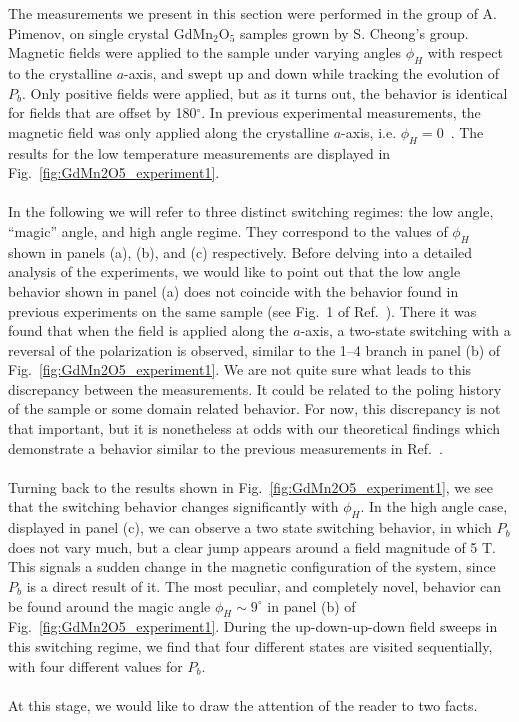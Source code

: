 The measurements we present in this section were performed in the group of A. Pimenov, on single crystal GdMn$_2$O$_5$ samples grown by S. Cheong's group.
Magnetic fields were applied to the sample under varying angles $\phi_H$ with respect to the crystalline $a$-axis, and swept up and down while tracking the evolution of $P_b$.
Only positive fields were applied, but as it turns out, the behavior is identical for fields that are offset by 180$^\circ$. 
In previous experimental measurements, the magnetic field was only applied along the crystalline $a$-axis, i.e. $\phi_H = 0$~\cite{Lee13}.
The results for the low temperature measurements are displayed in Fig.~\ref{fig:GdMn2O5_experiment1}.
\\\\
In the following we will refer to three distinct switching regimes: the low angle, ``magic'' angle, and high angle regime.
They correspond to the values of $\phi_H$ shown in panels (a), (b), and (c) respectively.
Before delving into a detailed analysis of the experiments, we would like to point out that the low angle behavior shown in panel (a) does not coincide with the behavior found in previous experiments on the same sample (see Fig.~1 of Ref.~\cite{Lee13}).
There it was found that when the field is applied along the $a$-axis, a two-state switching with a reversal of the polarization is observed, similar to the 1--4 branch in panel (b) of Fig.~\ref{fig:GdMn2O5_experiment1}.
We are not quite sure what leads to this discrepancy between the measurements. It could be related to the poling history of the sample or some domain related behavior.
For now, this discrepancy is not that important, but it is nonetheless at odds with our theoretical findings which demonstrate a behavior similar to the previous measurements in Ref.~\cite{Lee13}. 
\\\\
Turning back to the results shown in Fig.~\ref{fig:GdMn2O5_experiment1}, we see that the switching behavior changes significantly with $\phi_H$.
In the high angle case, displayed in panel (c), we can observe a two state switching behavior, in which $P_b$ does not vary much, but a clear jump appears around a field magnitude of 5 T.
This signals a sudden change in the magnetic configuration of the system, since $P_b$ is a direct result of it.
The most peculiar, and completely novel, behavior can be found around the magic angle $\phi_H \sim 9^\circ$ in panel (b) of Fig.~\ref{fig:GdMn2O5_experiment1}.
During the up-down-up-down field sweeps in this switching regime, we find that four different states are visited sequentially, with four different values for $P_b$.
\\\\
At this stage, we would like to draw the attention of the reader to two facts.

